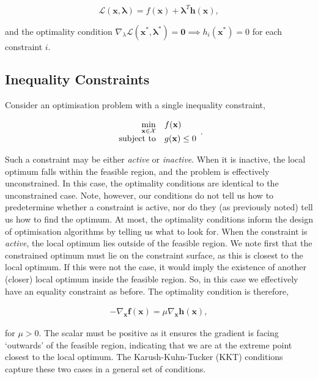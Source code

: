 \documentclass[11pt]{amsart}
\begin{document}
$$\mathcal{L}(\mathbf{x}, \boldsymbol\lambda) = f(\mathbf{x}) + \boldsymbol\lambda^T \mathbf{h}(\mathbf{x}),$$

and the optimality condition $\nabla_{\lambda}\mathcal{L}(\mathbf{x}^*, \boldsymbol\lambda^*) = \mathbf{0} \implies h_i(\mathbf{x}^*) = 0$ for each constraint $i$.

\subsection{Inequality Constraints}

Consider an optimisation problem with a single inequality constraint,

\begin{align}
\begin{array}{rl}
\displaystyle \min_{\mathbf{x} \in \mathcal{X}} & f(\mathbf{x})\\
\text{subject to} & g(\mathbf{x}) \leq 0
\end{array} \notag.
\end{align}

Such a constraint may be either \emph{active} or \emph{inactive}. When it is inactive, the local optimum falls within the feasible region, and the problem is effectively unconstrained. In this case, the optimality conditions are identical to the unconstrained case. Note, however, our conditions do not tell us how to predetermine whether a constraint is active, nor do they (as previously noted) tell us how to find the optimum. At most, the optimality conditions inform the design of optimisation algorithms by telling us what to look for. When the constraint is \emph{active}, the local optimum lies outside of the feasible region. We note first that the constrained optimum must lie on the constraint surface, as this is closest to the local optimum. If this were not the case, it would imply the existence of another (closer) local optimum inside the feasible region. So, in this case we effectively have an equality constraint as before. The optimality condition is therefore,

\begin{align}-\nabla_{\mathbf{x}}\mathbf{f}(\mathbf{x}) = \mu\nabla_{\mathbf{x}}\mathbf{h}(\mathbf{x})\label{eq:inequalityconstraint},\end{align}

for $\mu > 0$. The scalar must be positive as it ensures the gradient is facing `outwards' of the feasible region, indicating that we are at the extreme point closest to the local optimum. The Karush-Kuhn-Tucker (KKT) conditions capture these two cases in a general set of conditions.
\end{document}
